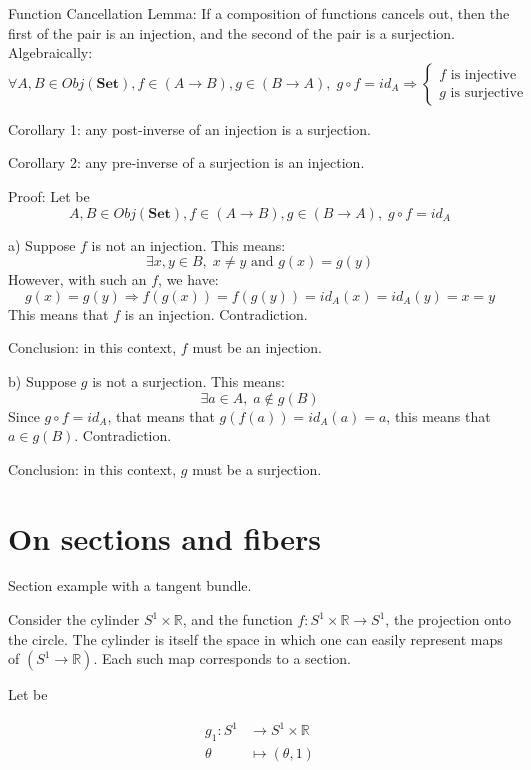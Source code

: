 Function Cancellation Lemma: If a composition of functions cancels out, then the first of the pair is an injection, and the second of the pair is a surjection. Algebraically:
$$
\forall A, B \in Obj(\textbf{Set}),
f \in (A \to B), g \in (B \to A), \;
	g \circ f = id_A
\Rightarrow
	\begin{cases}
		f \text{ is injective} \\
		g \text{ is surjective}
	\end{cases}
$$

Corollary 1: any post-inverse of an injection is a surjection.

Corollary 2: any pre-inverse of a surjection is an injection.

Proof: Let be 
$$A, B \in Obj(\textbf{Set}), f \in (A \to B), g \in (B \to A), \; g \circ f = id_A$$

a) Suppose $f$ is not an injection. This means:
$$\exists x, y \in B, \; x \neq y \text{ and } g(x) = g(y)$$
However, with such an $f$, we have:
$$g(x) = g(y) \Rightarrow f(g(x)) = f(g(y)) = id_A(x) = id_A(y) = x = y$$
This means that $f$ is an injection. Contradiction.

Conclusion: in this context, $f$ must be an injection.

b) Suppose $g$ is not a surjection. This means:
$$\exists a \in A, \; a \notin g(B)$$
Since $g \circ f = id_A$, that means that $g(f(a)) = id_A(a) = a$, this means that $a \in g(B)$. Contradiction.

Conclusion: in this context, $g$ must be a surjection.



\section*{On sections and fibers}

Section example with a tangent bundle.

Consider the cylinder $S^1 \times \mathbb{R}$, and the function $f : S^1 \times \mathbb{R} \to S^1$, the projection onto the circle. The cylinder is itself the space in which one can easily represent maps of $(S^1 \to \mathbb{R})$. Each such map corresponds to a section.

Let be 

$$
\begin{aligned}
g_1 : S^1    & \longrightarrow  S^1 \times \mathbb{R} \\
      \theta & \longmapsto      (\theta, 1)
\end{aligned}
$$


